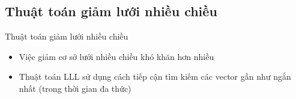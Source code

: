 \documentclass{beamer}
\numberwithin{equation}{section}
\begin{document}
\subsection{Thuật toán giảm lưới nhiều chiều}
\begin{frame}{Thuật toán giảm lưới nhiều chiều}
\begin{itemize}
\item Việc giảm cơ sở lưới nhiều chiều khó khăn hơn nhiều
\item Thuật toán LLL sử dụng cách tiếp cận tìm kiếm các vector gần như ngắn nhất (trong thời gian đa thức)
\end{itemize}
\end{frame}

\end{document}
